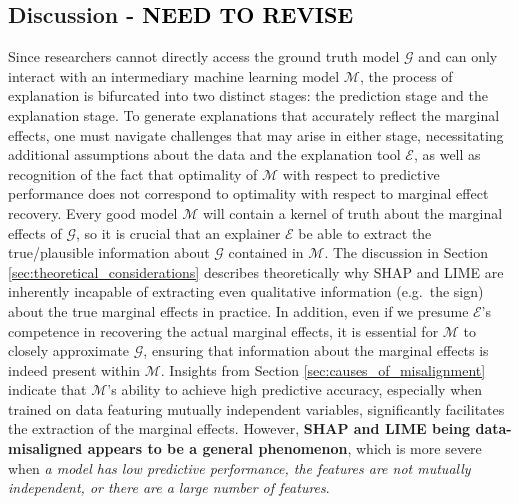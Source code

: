 \documentclass[mnsc,blindrev]{informs3}
\begin{document}
    \subsection{Discussion - \textcolor{black}{NEED TO REVISE}}
            Since researchers cannot directly access the ground truth model $\mathcal{G}$ and can only interact with an intermediary machine learning model $\mathcal{M}$, the process of explanation is bifurcated into two distinct stages: the prediction stage and the explanation stage. To generate explanations that accurately reflect the marginal effects, one must navigate challenges that may arise in either stage, necessitating additional assumptions about the data and the explanation tool $\mathcal{E}$, as well as recognition of the fact that optimality of $\mathcal{M}$ with respect to predictive performance does not correspond to optimality with respect to marginal effect recovery. Every good model $\mathcal{M}$ will contain a kernel of truth about the marginal effects of $\mathcal{G}$, so it is crucial that an explainer $\mathcal{E}$ be able to extract the true/plausible information about $\mathcal{G}$ contained in $\mathcal{M}$. The discussion in Section \ref{sec:theoretical_considerations} describes theoretically why SHAP and LIME are inherently incapable of extracting even qualitative information (e.g.~the sign) about the true marginal effects in practice. In addition, even if we presume $\mathcal{E}$'s competence in recovering the actual marginal effects, it is essential for $\mathcal{M}$ to closely approximate $\mathcal{G}$, ensuring that information about the marginal effects is indeed present within $\mathcal{M}$. Insights from Section \ref{sec:causes_of_misalignment} indicate that $\mathcal{M}$'s ability to achieve high predictive accuracy, especially when trained on data featuring mutually independent variables, significantly facilitates the extraction of the marginal effects. However, \textbf{SHAP and LIME being data-misaligned appears to be a general phenomenon}, which is more severe when \textit{a model has low predictive performance, the features are not mutually independent, or there are a large number of features}. 


\end{document}
